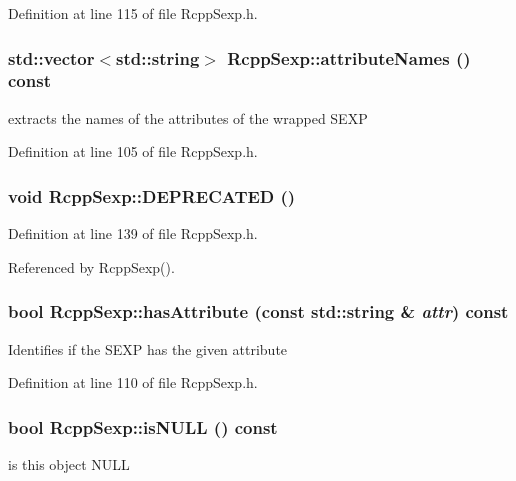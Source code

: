 Definition at line 115 of file RcppSexp.h.\hypertarget{classRcppSexp_a2e2c70bec0b9f99c523c364ebccaa4f3}{
\subsubsection[{attributeNames}]{\setlength{\rightskip}{0pt plus 5cm}std::vector$<$std::string$>$ RcppSexp::attributeNames () const}}
\label{classRcppSexp_a2e2c70bec0b9f99c523c364ebccaa4f3}
extracts the names of the attributes of the wrapped SEXP 

Definition at line 105 of file RcppSexp.h.\hypertarget{classRcppSexp_acb702de59d20b6d4f5a0ca8a8052f1b9}{
\subsubsection[{DEPRECATED}]{\setlength{\rightskip}{0pt plus 5cm}void RcppSexp::DEPRECATED ()}}
\label{classRcppSexp_acb702de59d20b6d4f5a0ca8a8052f1b9}


Definition at line 139 of file RcppSexp.h.

Referenced by RcppSexp().\hypertarget{classRcppSexp_a26b3bf25f73cc6fb9c4fc7681ed62a6e}{
\subsubsection[{hasAttribute}]{\setlength{\rightskip}{0pt plus 5cm}bool RcppSexp::hasAttribute (const std::string \& {\em attr}) const}}
\label{classRcppSexp_a26b3bf25f73cc6fb9c4fc7681ed62a6e}
Identifies if the SEXP has the given attribute 

Definition at line 110 of file RcppSexp.h.\hypertarget{classRcppSexp_a9c9535a92dacf3efe0c2267a54360ee7}{
\subsubsection[{isNULL}]{\setlength{\rightskip}{0pt plus 5cm}bool RcppSexp::isNULL () const}}
\label{classRcppSexp_a9c9535a92dacf3efe0c2267a54360ee7}
is this object NULL 

